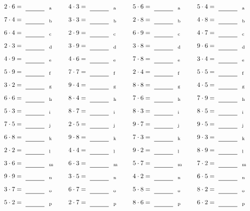 \documentclass
[
  draft    = true,
  fontsize = 11pt,
  parskip  = half-
]
{scrartcl}
\begin{document}
\par\vfill\par
\begin{align*}
    \pline{2\cdot6}&=\rline{a}
  & \pline{4\cdot3}&=\rline{a}
  & \pline{5\cdot6}&=\rline{a}
  & \pline{5\cdot4}&=\rline{a} \\[1ex]
    \pline{7\cdot4}&=\rline{b}
  & \pline{3\cdot3}&=\rline{b}
  & \pline{2\cdot8}&=\rline{b}
  & \pline{4\cdot8}&=\rline{b} \\[1ex]
    \pline{6\cdot4}&=\rline{c}
  & \pline{2\cdot9}&=\rline{c}
  & \pline{6\cdot9}&=\rline{c}
  & \pline{4\cdot7}&=\rline{c} \\[1ex]
    \pline{2\cdot3}&=\rline{d}
  & \pline{3\cdot9}&=\rline{d}
  & \pline{3\cdot8}&=\rline{d}
  & \pline{9\cdot6}&=\rline{d} \\[1ex]
    \pline{4\cdot9}&=\rline{e}
  & \pline{4\cdot6}&=\rline{e}
  & \pline{7\cdot8}&=\rline{e}
  & \pline{3\cdot4}&=\rline{e} \\[1ex]
    \pline{5\cdot9}&=\rline{f}
  & \pline{7\cdot7}&=\rline{f}
  & \pline{2\cdot4}&=\rline{f}
  & \pline{5\cdot5}&=\rline{f} \\[1ex]
    \pline{3\cdot2}&=\rline{g}
  & \pline{9\cdot4}&=\rline{g}
  & \pline{8\cdot8}&=\rline{g}
  & \pline{4\cdot5}&=\rline{g} \\[1ex]
    \pline{6\cdot6}&=\rline{h}
  & \pline{8\cdot4}&=\rline{h}
  & \pline{7\cdot6}&=\rline{h}
  & \pline{7\cdot9}&=\rline{h} \\[1ex]
    \pline{5\cdot3}&=\rline{i}
  & \pline{8\cdot7}&=\rline{i}
  & \pline{8\cdot3}&=\rline{i}
  & \pline{8\cdot5}&=\rline{i} \\[1ex]
    \pline{7\cdot5}&=\rline{j}
  & \pline{2\cdot5}&=\rline{j}
  & \pline{9\cdot7}&=\rline{j}
  & \pline{9\cdot5}&=\rline{j} \\[1ex]
    \pline{6\cdot8}&=\rline{k}
  & \pline{9\cdot8}&=\rline{k}
  & \pline{7\cdot3}&=\rline{k}
  & \pline{9\cdot3}&=\rline{k} \\[1ex]
    \pline{2\cdot2}&=\rline{l}
  & \pline{4\cdot4}&=\rline{l}
  & \pline{9\cdot2}&=\rline{l}
  & \pline{8\cdot9}&=\rline{l} \\[1ex]
    \pline{3\cdot6}&=\rline{m}
  & \pline{6\cdot3}&=\rline{m}
  & \pline{5\cdot7}&=\rline{m}
  & \pline{7\cdot2}&=\rline{m} \\[1ex]
    \pline{9\cdot9}&=\rline{n}
  & \pline{3\cdot5}&=\rline{n}
  & \pline{4\cdot2}&=\rline{n}
  & \pline{6\cdot5}&=\rline{n} \\[1ex]
    \pline{3\cdot7}&=\rline{o}
  & \pline{6\cdot7}&=\rline{o}
  & \pline{5\cdot8}&=\rline{o}
  & \pline{8\cdot2}&=\rline{o} \\[1ex]
    \pline{5\cdot2}&=\rline{p}
  & \pline{2\cdot7}&=\rline{p}
  & \pline{8\cdot6}&=\rline{p}
  & \pline{6\cdot2}&=\rline{p}
\end{align*}
\end{document}
